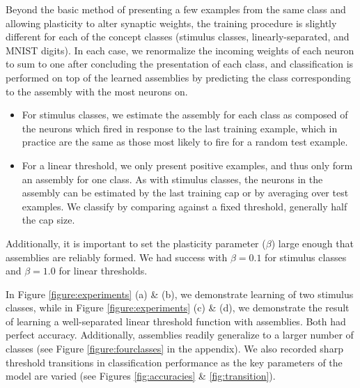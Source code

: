 \documentclass[final,12pt]{colt2022} %
\begin{document}
Beyond the basic method of presenting a few examples from the same class and allowing plasticity to alter synaptic weights, the training procedure is slightly different for each of the concept classes (stimulus classes, linearly-separated, and MNIST digits). In each case, we renormalize the incoming weights of each neuron to sum to one after concluding the presentation of each class, and classification is performed on top of the learned assemblies by predicting the class corresponding to the assembly with the most neurons on. \begin{itemize}
    \item For stimulus classes, we estimate the assembly for each class as composed of the neurons which fired in response to the last training example, which in practice are the same as those most likely to fire for a random test example. 
    \item For a linear threshold, we only present positive examples, and thus only form an assembly for one class. As with stimulus classes, the neurons in the assembly can be estimated by the last training cap or by averaging over test examples. We classify by comparing against a fixed threshold, generally half the cap size.
\end{itemize}
Additionally, it is important to set the plasticity parameter ($\beta$) large enough that assemblies are reliably formed. We had success with $\beta = 0.1$ for stimulus classes and $\beta = 1.0$ for linear thresholds.


In Figure \ref{figure:experiments} (a) \& (b), we demonstrate learning of two stimulus classes, while in
Figure \ref{figure:experiments} (c) \& (d), we demonstrate the result of learning a well-separated linear threshold function with assemblies.  Both had perfect accuracy. Additionally, assemblies readily generalize to a larger number of classes (see Figure \ref{figure:fourclasses} in the appendix). We also recorded sharp threshold transitions in classification performance as the key parameters of the model are varied (see Figures \ref{fig:accuracies} \& \ref{fig:transition}).
\end{document}
